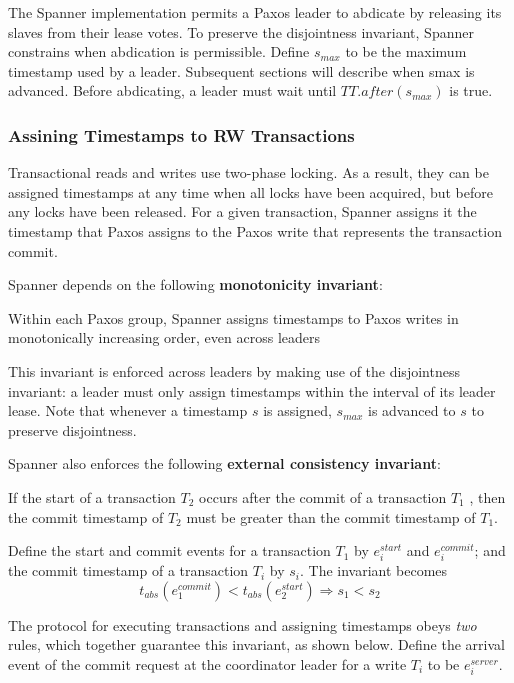 \documentclass[11pt]{article}
\begin{document}
The Spanner implementation permits a Paxos leader to abdicate by releasing its slaves from their lease
votes. To preserve the disjointness invariant, Spanner constrains when abdication is permissible.
Define \(s_{max}\) to be the maximum timestamp used by a leader. Subsequent sections will describe
when smax is advanced. Before abdicating, a leader must wait until \(TT.after(s_{max})\) is true.
\subsubsection{Assining Timestamps to RW Transactions}
\label{sec:orgbf04eb2}
Transactional reads and writes use two-phase locking. As a result, they can be assigned timestamps at
any time when all locks have been acquired, but before any locks have been released. For a given
transaction, Spanner assigns it the timestamp that Paxos assigns to the Paxos write that represents
the transaction commit.

Spanner depends on the following \textbf{monotonicity invariant}:
\begin{center}
Within each Paxos group, Spanner assigns timestamps to Paxos writes in monotonically increasing order,
even across leaders
\end{center}
This invariant is enforced across leaders by making use of the disjointness invariant: a leader must
only assign timestamps within the interval of its leader lease. Note that whenever a timestamp \(s\) is
assigned, \(s_{max}\) is advanced to \(s\) to preserve disjointness.

Spanner also enforces the following \textbf{external consistency invariant}:
\begin{center}
If the start of a transaction \(T_2\) occurs after the commit of a transaction \(T_1\) , then the
commit timestamp of \(T_2\) must be greater than the commit timestamp of \(T_1\).
\end{center}
Define the start and commit events for a transaction \(T_1\) by \(e_i^{start}\) and \(e_i^{commit}\);
and the commit timestamp of a transaction \(T_i\) by \(s_i\). The invariant becomes
\begin{equation*}
t_{abs}(e^{commit}_1)<t_{abs}(e_2^{start})\Rightarrow s_1<s_2
\end{equation*}

The protocol for executing transactions and assigning timestamps obeys \emph{two} rules, which together
guarantee this invariant, as shown below. Define the arrival event of the commit request at the
coordinator leader for a write \(T_i\) to be \(e_i^{server}\).
\end{document}
